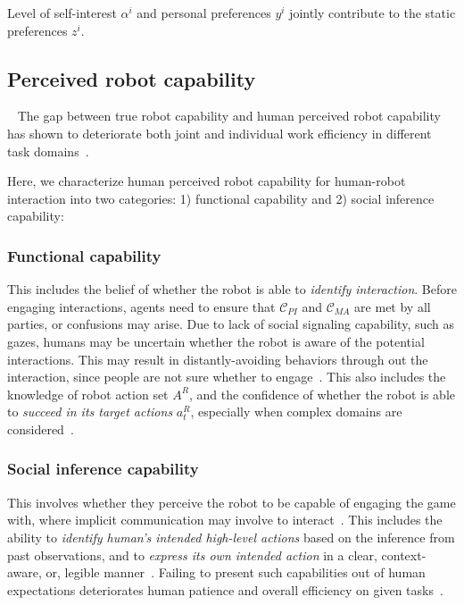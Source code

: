 \documentclass[letterpaper, 10 pt, conference]{ieeeconf}  %
\begin{document}
Level of self-interest $\alpha^i$ and personal preferences $y^i$ jointly contribute to the 
static preferences $z^i$.
\vspace{-.3em}
\subsection{Perceived robot capability}~\label{sec:perceived}
\vspace{-.3em}
The gap between true robot capability and human perceived robot capability  
has shown to deteriorate both joint and individual work efficiency in 
different task domains~\cite{dragan2015effects}. 

Here, we characterize human perceived robot capability for human-robot interaction into two categories: 1) functional capability and 2) social inference capability:

\subsubsection{Functional capability}
This includes the belief of whether the robot is able to \textit{identify 
interaction}. Before engaging interactions, agents need to ensure that 
$\mathcal{C}_{PI}$ and $\mathcal{C}_{MA}$ are met by all parties, or 
confusions may arise. Due to lack of social signaling capability, such as gazes, 
humans may be uncertain whether the robot is aware of the potential 
interactions. This may result in distantly-avoiding behaviors through out the interaction, since 
people are not sure whether to engage~\cite{dragan2015effects}.
This also includes the knowledge of robot action set $A^R$, and the confidence of 
whether the robot is able to \textit{succeed in its target actions} $a^R_t$, 
especially when complex domains are considered~\cite{chen2018planning}. 

\subsubsection{Social inference capability}
This involves whether they perceive the robot to be capable of engaging the 
game with, where implicit communication may involve to 
interact~\cite{knepper2017implicit}. This includes the ability to
\textit{identify human's intended high-level actions} based on the inference from 
past observations, and to \textit{express its own intended action} in a clear, 
context-aware, or, legible manner~\cite{dragan2013legibility}. Failing to 
present such capabilities out of human expectations deteriorates human patience 
and overall efficiency on given tasks~\cite{cha2015perceived}. 
\end{document}
